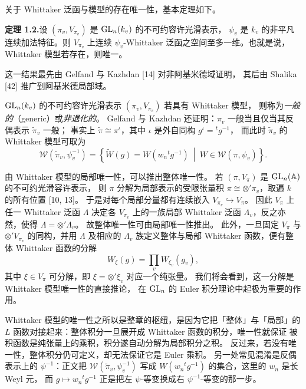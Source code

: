 关于 Whittaker 泛函与模型的存在唯一性，基本定理如下。

\textbf{定理 1.2.}\quad 设 $(\pi_v,V_{\pi_v})$ 是 $\mathrm{GL}_n(k_v)$ 的不可约容许光滑表示，
$\psi_v$ 是 $k_v$ 的非平凡连续加法特征。则 $V_{\pi_v}$ 上连续 $\psi_v$-Whittaker
泛函之空间至多一维。也就是说，Whittaker 模型若存在，则唯一。

这一结果最先由 Gelfand 与 Kazhdan [14] 对非阿基米德域证明，
其后由 Shalika [42] 推广到阿基米德局部域。

$\mathrm{GL}_n(k_v)$ 的不可约容许光滑表示 $(\pi_v,V_{\pi_v})$ 若具有 Whittaker 模型，
则称为\emph{一般的}（generic）或\emph{非退化的}。
Gelfand 与 Kazhdan 还证明：$\pi_v$ 一般当且仅当其反偶表示 $\widetilde{\pi}_v$ 一般；
事实上 $\widetilde{\pi}\cong\pi^\iota$，其中 $\iota$ 是外自同构 $g^\iota={}^tg^{-1}$，
而此时 $\widetilde{\pi}_v$ 的 Whittaker 模型可取为
\[
\mathcal{W}(\widetilde{\pi}_v,\psi_v^{-1})=\left\{\widetilde{W}(g)=W(w_n{}^tg^{-1})\ \middle|\ W\in\mathcal{W}(\pi,\psi_v)\right\}.
\]

由 Whittaker 模型的局部唯一性，可以推出整体唯一性。
若 $(\pi,V_\pi)$ 是 $\mathrm{GL}_n(\mathbb{A})$ 的不可约光滑容许表示，
则 $\pi$ 分解为局部表示的受限张量积 $\pi\cong\otimes'\pi_v$，取遍 $k$ 的所有位置 [10, 13]。
于是对每个局部分量都有连续嵌入 $V_{\pi_v}\hookrightarrow V_\pi$。
因此 $V_\pi$ 上任一 Whittaker 泛函 $\Lambda$ 决定各 $V_{\pi_v}$ 上的一族局部
Whittaker 泛函 $\Lambda_v$，反之亦然，使得 $\Lambda=\otimes'\Lambda_v$。
故整体唯一性可由局部唯一性推出。
此外，一旦固定 $V_\pi$ 与 $\otimes'V_{\pi_v}$ 的同构，并用 $\Lambda$ 及相应的
$\Lambda_v$ 族定义整体与局部 Whittaker 函数，便有整体 Whittaker 函数的分解
\[
W_\xi(g)=\prod_v W_{\xi_v}(g_v),
\]
其中 $\xi\in V_\pi$ 可分解，即 $\xi=\otimes'\xi_v$ 对应一个纯张量。
我们将会看到，这一分解是 Whittaker 模型唯一性的直接推论，
在 $\mathrm{GL}_n$ 的 Euler 积分理论中起极为重要的作用。
\begin{annote}
Whittaker 模型的唯一性之所以是整章的枢纽，是因为它把「整体」与「局部」的
$L$ 函数对接起来：整体积分一旦展开成 Whittaker 函数的积分，唯一性就保证
被积函数是纯张量上的乘积，积分遂自动分解为局部积分之积。
反过来，若没有唯一性，整体积分仍可定义，却无法保证它是 Euler 乘积。
另一处常见混淆是反偶表示上的 $\psi^{-1}$：正文把 $\mathcal{W}(\widetilde{\pi}_v,\psi_v^{-1})$
写成 $W(w_n{}^tg^{-1})$ 的集合，这里的 $w_n$ 是长 Weyl 元，
而 $g\mapsto w_n{}^tg^{-1}$ 正是把左 $\psi$-等变换成右 $\psi^{-1}$-等变的那一步。
\par{}
\end{annote}

